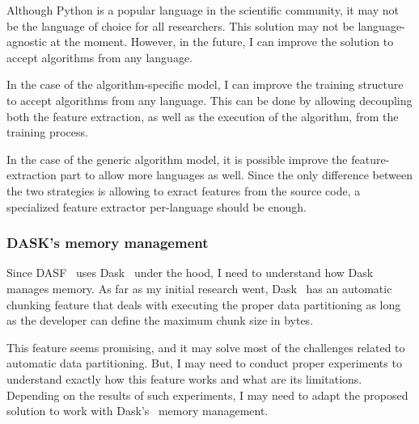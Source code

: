 Although Python is a popular language in the scientific community, it may not be the language of choice for all researchers.
This solution may not be language-agnostic at the moment.
However, in the future, I can improve the solution to accept algorithms from any language.

In the case of the algorithm-specific model, I can improve the training structure to accept algorithms from any language.
This can be done by allowing decoupling both the feature extraction, as well as the execution of the algorithm, from the training process.

In the case of the generic algorithm model, it is possible improve the feature-extraction part to allow more languages as well.
Since the only difference between the two strategies is allowing to exract features from the source code, a specialized feature extractor per-language should be enough.

\subsubsection{DASK's memory management}

Since \ac{DASF}~\cite{dasf} uses Dask~\cite{dask} under the hood, I need to understand how Dask~\cite{dask} manages memory.
As far as my initial research went, Dask~\cite{dask} has an automatic chunking feature that deals with executing the proper data partitioning as long as the developer can define the maximum chunk size in bytes.

This feature seems promising, and it may solve most of the challenges related to automatic data partitioning.
But, I may need to conduct proper experiments to understand exactly how this feature works and what are its limitations.
Depending on the results of such experiments, I may need to adapt the proposed solution to work with Dask's~\cite{dask} memory management.
